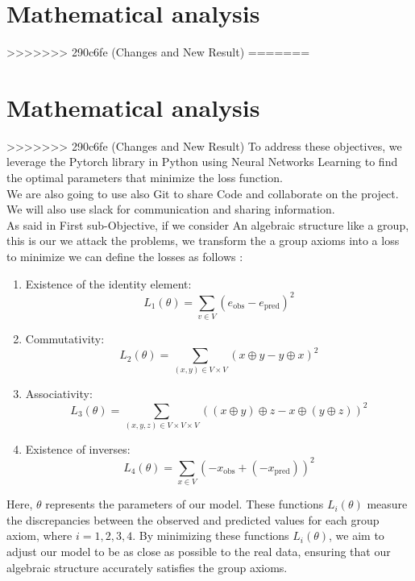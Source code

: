 \documentclass{report}
\begin{document}
\section{Mathematical analysis}
>>>>>>> 290c6fe (Changes and New Result)
=======
\section{Mathematical analysis}
>>>>>>> 290c6fe (Changes and New Result)
    To address these objectives, we leverage
    the Pytorch library in Python using Neural Networks Learning to find the optimal parameters that minimize the loss function.\\
    We are also going to use also Git to share Code and collaborate on the project.\\ 
    We will also use slack for communication and sharing information.\\

    As said in  First sub-Objective, if we consider An algebraic structure like a group, this is our we attack the problems, we transform the a group axioms into a loss to minimize we can define the losses as follows : 

    \begin{enumerate}
        \item Existence of the identity element:  \[
            L_1(\theta) = \sum_{v \in V} (e_{\text{obs}} - e_{\text{pred}})^2
            \]
        \item Commutativity:
        \[
        L_2(\theta) = \sum_{(x, y) \in V \times V} (x \oplus y - y \oplus x)^2
        \]
        \item Associativity:
        \[
        L_3(\theta) = \sum_{(x, y, z) \in V \times V \times V} ((x \oplus y) \oplus z - x \oplus (y \oplus z))^2
        \]
        \item Existence of inverses:
        \[
        L_4(\theta) = \sum_{x \in V} (-x_{\text{obs}} + (-x_{\text{pred}}))^2
        \] 
    \end{enumerate}
    
    Here, $\theta$ represents the parameters of our model.
    These functions $L_i(\theta)$ measure the discrepancies
    between the observed and predicted values for each group 
    axiom, where $i = 1, 2, 3, 4$. By minimizing these functions
    $L_i(\theta)$, we aim to adjust our model to be as close as
    possible to the real data, ensuring that our algebraic 
    structure accurately satisfies the group axioms. 
\end{document}
